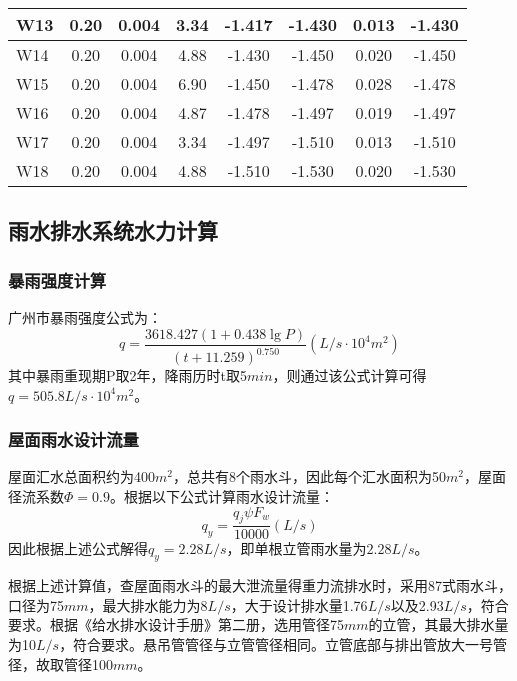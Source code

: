 \documentclass{gdutart}
\begin{document}
\begin{center}
\begin{xltabular}{\textwidth}{|Y|c|c|c|c|c|c|c|}
            \hline
            W13   & 0.20  & 0.004  & 3.34  & -1.417  & -1.430  & 0.013  & -1.430 \\
            \hline
            W14   & 0.20  & 0.004  & 4.88  & -1.430  & -1.450  & 0.020  & -1.450 \\
            \hline
            W15   & 0.20  & 0.004  & 6.90  & -1.450  & -1.478  & 0.028  & -1.478 \\
            \hline
            W16   & 0.20  & 0.004  & 4.87  & -1.478  & -1.497  & 0.019  & -1.497 \\
            \hline
            W17   & 0.20  & 0.004  & 3.34  & -1.497  & -1.510  & 0.013  & -1.510 \\
            \hline
            W18   & 0.20  & 0.004  & 4.88  & -1.510  & -1.530  & 0.020  & -1.530 \\
            \hline
          \end{xltabular}
        \end{center} \newpage

    \subsection{雨水排水系统水力计算}
      \subsubsection{暴雨强度计算}
        广州市暴雨强度公式为：
        \begin{equation}
          q = \frac{{3618.427(1 + 0.438\lg P)}}{{{{(t + 11.259)}^{0.750}}}}(L/s \cdot {10^4}{m^2})
        \end{equation}
        其中暴雨重现期P取2年，降雨历时t取5$min$，则通过该公式计算可得$q = 505.8L/s \cdot {10^4}{m^2}$。

      \subsubsection{屋面雨水设计流量}
        屋面汇水总面积约为400$m^2$，总共有8个雨水斗，因此每个汇水面积为50$m^2$，屋面径流系数$\Phi = 0.9$。根据以下公式计算雨水设计流量：
        \begin{equation}
          {q_y} = \frac{{{q_j}\psi {F_w}}}{{10000}}(L/s)
        \end{equation}
        因此根据上述公式解得$q_y = 2.28L/s$，即单根立管雨水量为$2.28L/s$。

        根据上述计算值，查屋面雨水斗的最大泄流量得重力流排水时，采用87式雨水斗，口径为75$mm$，最大排水能力为8$L/s$，大于设计排水量1.76$L/s$以及2.93$L/s$，符合要求。根据《给水排水设计手册》第二册，选用管径75$mm$的立管，其最大排水量为10$L/s$，符合要求。悬吊管管径与立管管径相同。立管底部与排出管放大一号管径，故取管径100$mm$。
\end{document}
